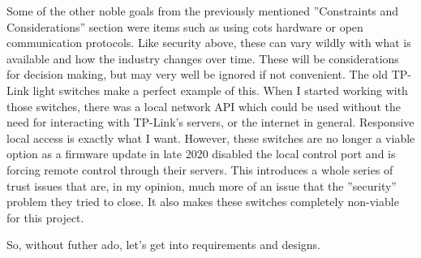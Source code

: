 Some of the other noble goals from the previously mentioned ''Constraints and Considerations'' section were items such
as using \gls{cots} hardware or open communication protocols.  Like security above, these can vary wildly with what is
available and how the industry changes over time.  These will be considerations for decision making, but may very well
be ignored if not convenient.  The old TP-Link light switches make a perfect example of this.  When I started working
with those switches, there was a local network API which could be used without the need for interacting with TP-Link's
servers, or the internet in general.  Responsive local access is exactly what I want.  However, these switches are no
longer a viable option as a firmware update in late 2020 disabled the local control port and is forcing remote control
through their servers.  This introduces a whole series of trust issues that are, in my opinion, much more of an issue
that the ''security'' problem they tried to close.  It also makes these switches completely non-viable for this project.

So, without futher ado, let's get into requirements and designs.
